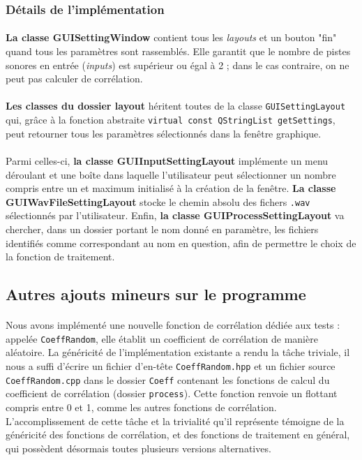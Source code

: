  \subsubsection{Détails de l'implémentation}
 \paragraph{}
 \textbf{La classe GUISettingWindow} contient tous les
 \textit{layouts} et un bouton "fin" quand tous les paramètres sont
 rassemblés. Elle garantit que le nombre de pistes sonores en entrée
 (\textit{inputs}) est supérieur ou égal à 2 ; dans le cas contraire,
 on ne peut pas calculer de corrélation.
 \paragraph{}
 \textbf{Les classes du dossier layout} héritent toutes de la classe
 \verb!GUISettingLayout! qui, grâce à la fonction abstraite
 \verb!virtual const QStringList getSettings!, peut retourner tous les
 paramètres sélectionnés dans la fenêtre graphique.
 \paragraph{}
 Parmi celles-ci, \textbf{la classe GUIInputSettingLayout} implémente
 un menu déroulant et une boîte dans laquelle l'utilisateur peut
 sélectionner un nombre compris entre un et maximum initialisé à la
 création de la fenêtre. \textbf{La classe GUIWavFileSettingLayout}
 stocke le chemin absolu des fichers \verb!.wav! sélectionnés par
 l'utilisateur. Enfin, \textbf{la classe GUIProcessSettingLayout} va
 chercher, dans un dossier portant le nom donné en paramètre, les
 fichiers identifiés comme correspondant au nom en question, afin de
 permettre le choix de la fonction de traitement.
 
 
 \subsection{Autres ajouts mineurs sur le programme}
 \paragraph{}
 Nous avons implémenté une nouvelle fonction de corrélation dédiée aux
 tests : appelée \verb!CoeffRandom!, elle établit un coefficient de
 corrélation de manière aléatoire. La généricité de l'implémentation
 existante a rendu la tâche triviale, il nous a suffi d'écrire un
 fichier d'en-tête \verb!CoeffRandom.hpp! et un fichier source
 \verb!CoeffRandom.cpp! dans le dossier \verb!Coeff! contenant les
 fonctions de calcul du coefficient de corrélation (dossier
 \verb!process!). Cette fonction renvoie un flottant compris entre 0 et
 1, comme les autres fonctions de corrélation. L'accomplissement de
 cette tâche et la trivialité qu'il représente témoigne de la
 généricité des fonctions de corrélation, et des fonctions de
 traitement en général, qui possèdent désormais toutes plusieurs
 versions alternatives.
